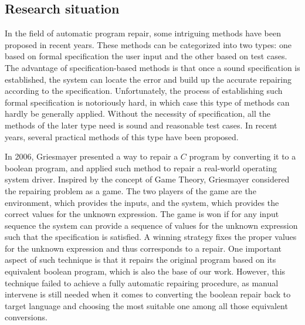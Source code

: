 \subsection{Research situation}
\label{section:ResearchSituation}
In the field of automatic program repair, some intriguing methods have been proposed in recent years.
These methods can be categorized into two types: one based on formal specification the user input and the other based on test cases.
The advantage of specification-based methods is that once a sound specification is established, the system can locate the error and build up the accurate repairing according to the specification.
Unfortunately, the process of establishing such formal specification is notoriously hard, in which case this type of methods can hardly be generally applied.
Without the necessity of specification, all the methods of the later type need is sound and reasonable test cases. In recent years, several practical methods of this type have been proposed.

In 2006, Griesmayer presented a way to repair a $C$ program by converting it to a boolean program, and applied such method to repair a real-world operating system driver\cite{RoBPwaAtC}.
Inspired by the concept of Game Theory, Griesmayer considered the repairing problem as a game\cite{PRaaG}. The two players of the game are the environment, which provides the inputs, and the system, which provides the correct values for the unknown expression. The game is won if for any input sequence the system can provide a sequence of values for the unknown expression such that the specification is satisfied. A winning strategy fixes the proper values for the unknown expression and thus corresponds to a repair.
One important aspect of such technique is that it repairs the original program based on its equivalent boolean program, which is also the base of our work.
However, this technique failed to achieve a fully automatic repairing procedure, as manual intervene is still needed when it comes to converting the boolean repair back to target language and choosing the most suitable one among all those equivalent conversions.

